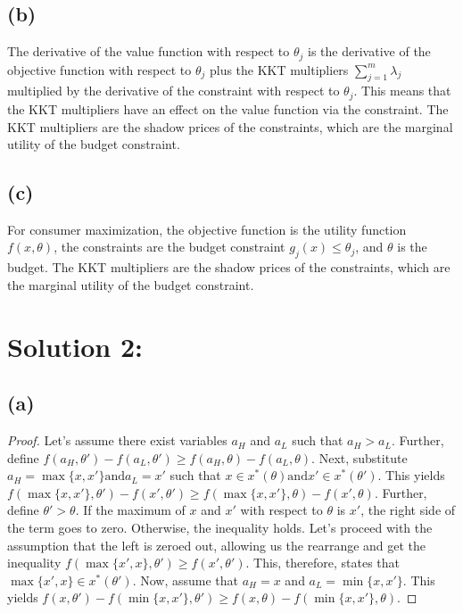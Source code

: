\documentclass[10pt, a4paper]{article}
\begin{document}
    \subsection*{(b)}
        The derivative of the value function with respect to $\theta_j$ is the derivative of the objective function with respect to $\theta_j$ plus the KKT multipliers $\sum\limits_{j=1}^m\lambda_j$
        multiplied by the derivative of the constraint with respect to $\theta_j$. This means that the KKT multipliers have an effect on the value function via the constraint. The KKT multipliers are
        the shadow prices of the constraints, which are the marginal utility of the budget constraint.
    \subsection*{(c)}
        For consumer maximization, the objective function is the utility function $f(x,\theta)$, the constraints are the budget constraint $g_j(x)\leq\theta_j$, and $\theta$ is the budget. The KKT multipliers
        are the shadow prices of the constraints, which are the marginal utility of the budget constraint.
\section*{Solution 2:}
    \subsection*{(a)}
        \begin{proof}
            Let's assume there exist variables $a_H$ and $a_L$ such that $a_H > a_L$. Further, define $f(a_H,\theta') - f(a_L,\theta') \geq f(a_H,\theta)-f(a_L,\theta)$. Next, substitute
            $a_H = \max\{x,x'\} \text{and} a_L = x'$ such that $x\in x^*(\theta) \text{and} x'\in x^*(\theta')$. This yields $f(\max\{x,x'\},\theta') - f(x',\theta') \geq f(\max\{x,x'\},\theta) - f(x',\theta)$.
            Further, define $\theta'>\theta$. If the maximum of $x$ and $x'$ with respect to $\theta$ is $x'$, the right side of the term goes to zero. Otherwise, the inequality holds. Let's
            proceed with the assumption that the left is zeroed out, allowing us the rearrange and get the inequality $f(\max\{x',x\},\theta')\geq f(x',\theta')$. This, therefore, states that 
            $\max\{x',x\} \in x^*(\theta')$. Now, assume that $a_H = x$ and $a_L = \min\{x,x'\}$. This yields $f(x,\theta') - f(\min\{x,x'\},\theta') \geq f(x,\theta) - f(\min\{x,x'\},\theta)$. 
        \end{proof}
\end{document}
